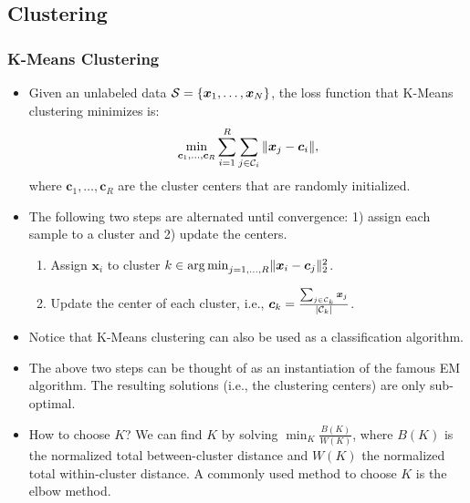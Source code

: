 \subsection{Clustering}
    \subsubsection{K-Means Clustering}
        \begin{itemize}
             
            \item Given an unlabeled data $\mathcal{S}=\{ \bm{x}_1, \ldots, \bm{x}_N \}$, the loss function that K-Means clustering minimizes is:
            \begin{equation}
                \min_{\bm{c}_1, \ldots, \bm{c}_R} \sum_{i=1}^{R}{
                    \sum_{j \in \mathcal{C}_i}^{}{\lVert\bm{x}_j - \bm{c}_i\rVert}
                },
            \end{equation}
            where $\bm{c}_1, \ldots, \bm{c}_R$ are the cluster centers that are  randomly initialized.
            
            \item The following two steps are alternated until convergence: 1) assign each sample to a cluster and 2) update the centers.
            \begin{enumerate}
                \item Assign $\bm{x}_i$ to cluster $k \in \operatorname{arg\,min}_{j=1,\ldots, R}\lVert\bm{x}_i - \bm{c}_j\rVert_2^2$.
                \item Update the center of each cluster, i.e., $\bm{c}_k = \frac{\sum_{j \in \mathcal{C}_k}^{}{\bm{x}_j}}{| \mathcal{C}_k |}$.
            \end{enumerate}
            \item Notice that K-Means clustering can also be used as a classification algorithm. 
            \item The above two steps can be thought of as an instantiation of the famous EM algorithm.
            The resulting solutions (i.e., the clustering centers) are only sub-optimal.
            \item How to choose $K$? We can find $K$ by solving $\min_{K} \frac{B(K)}{W(K)}$, where $B(K)$ is the normalized total between-cluster distance and $W(K)$ the normalized total within-cluster distance. 
            A commonly used method to choose $K$ is the elbow method.
        \end{itemize}
    
